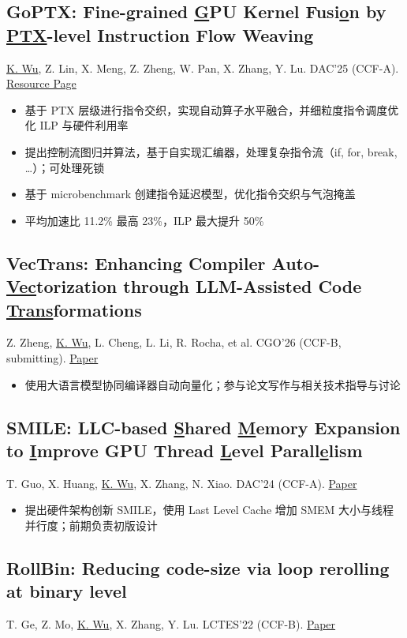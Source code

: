 \documentclass[
    scheme=plain
]{ctexart}
\newcommand{\datedsubsection}[2]{%
\subsection[#1]{#1 \hfill #2}
}
\begin{document}
\datedsubsection{\textbf{GoPTX: Fine-grained \underline{G}PU Kernel Fusi\underline{o}n by \underline{PTX}-level Instruction Flow Weaving}}{}

\underline{K. Wu}, Z. Lin, X. Meng, Z. Zheng, W. Pan, X. Zhang, Y. Lu. DAC'25 (CCF-A). \href{https://wu-kan.cn/2025/06/25/DAC25-GoPTX/}{Resource Page}

\begin{itemize}
    \item 基于 PTX 层级进行指令交织，实现自动算子水平融合，并细粒度指令调度优化 ILP 与硬件利用率
    \item 提出控制流图归并算法，基于自实现汇编器，处理复杂指令流（if, for, break, \dots）；可处理死锁
    \item 基于 microbenchmark 创建指令延迟模型，优化指令交织与气泡掩盖
    \item 平均加速比 11.2\% 最高 23\%，ILP 最大提升 50\%
\end{itemize}

\datedsubsection{\textbf{VecTrans: Enhancing Compiler Auto-\underline{Vec}torization through LLM-Assisted Code \underline{Trans}formations}}{}

Z. Zheng, \underline{K. Wu}, L. Cheng, L. Li, R. Rocha, et al. CGO'26 (CCF-B, submitting). \href{https://arxiv.org/abs/2503.19449}{Paper}

\begin{itemize}
    \item 使用大语言模型协同编译器自动向量化；参与论文写作与相关技术指导与讨论
\end{itemize}

\datedsubsection{\textbf{SMILE: LLC-based \underline{S}hared \underline{M}emory Expansion to \underline{I}mprove GPU Thread \underline{L}evel Parall\underline{e}lism}}{}

T. Guo, X. Huang, \underline{K. Wu}, X. Zhang, N. Xiao. DAC'24 (CCF-A). \href{https://dl.acm.org/doi/10.1145/3649329.3655906}{Paper}

\begin{itemize}
  \item 提出硬件架构创新 SMILE，使用 Last Level Cache 增加 SMEM 大小与线程并行度；前期负责初版设计
\end{itemize}

\datedsubsection{\textbf{RollBin: Reducing code-size via loop rerolling at binary level}}{}

T. Ge, Z. Mo, \underline{K. Wu}, X. Zhang, Y. Lu. LCTES'22 (CCF-B). \href{https://dl.acm.org/doi/10.1145/3519941.3535072}{Paper}
\end{document}
